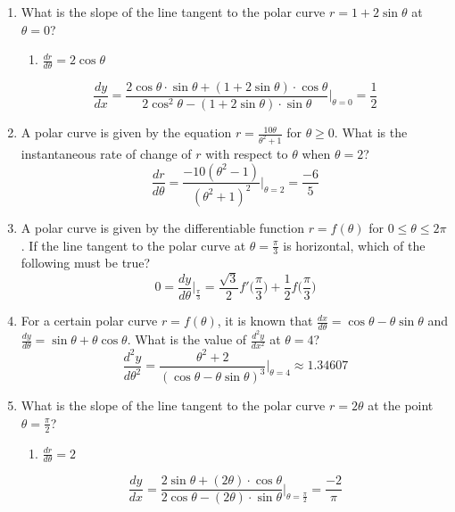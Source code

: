 \documentclass[12pt]{article}
\begin{document}
\begin{enumerate}
	\item What is the slope of the line tangent to the polar curve $r=1+2\sin \theta$ at $\theta=0$?
	      \begin{enumerate}
	      	\item $\frac{dr}{d\theta} = 2\cos \theta$
	      \end{enumerate}
	      $$\frac{dy}{dx} = \frac{2\cos\theta \cdot \sin \theta + (1+2\sin \theta) \cdot \cos\theta}{2\cos^2\theta -(1+2\sin \theta)\cdot \sin\theta}\biggr\rvert_{\theta=0} = \boxed{\frac{1}{2}}$$
	\item A polar curve is given by the equation $r=\frac{10\theta}{\theta^2+1}$ for $\theta \geq 0$. What is the instantaneous rate of change of $r$ with respect to $\theta$ when $\theta=2$?
	      $$\frac{dr}{d\theta} = \frac{-10(\theta^2-1)}{(\theta^2+1)^2}\biggr\rvert_{\theta = 2} = \boxed{\frac{-6}{5}}$$
	\item A polar curve is given by the differentiable function $r=f(\theta)$ for $0\leq \theta \leq 2\pi$. If the line tangent to the polar curve at $\theta=\frac{\pi}{3}$ is horizontal, which of the following must be true?
	      $$0=\frac{dy}{d\theta}\biggr\rvert_{\frac{\pi}{3}} = \boxed{\frac{\sqrt{3}}{2}f'\bigg(\frac{\pi}{3}\bigg)+\frac{1}{2}f\bigg(\frac{\pi}{3}\bigg)} $$
	\item For a certain polar curve $r=f(\theta)$, it is known that $\frac{dx}{d\theta} = \cos \theta - \theta\sin\theta$ and $\frac{dy}{d\theta} = \sin \theta + \theta\cos \theta$. What is the value of $\frac{d^2y}{dx^2}$ at $\theta=4$?
	      $$\frac{d^2y}{d\theta^2} = \frac{\theta^2+2}{(\cos\theta - \theta\sin\theta)^3}\biggr\rvert_{\theta = 4} \approx \boxed{1.34607}$$
	\item What is the slope of the line tangent to the polar curve $r=2\theta$ at the point $\theta=\frac{\pi}{2}$?
	      \begin{enumerate}
	      	\item $\frac{dr}{d\theta} = 2$
	      \end{enumerate}
	      $$\frac{dy}{dx} = \frac{2 \sin \theta + (2\theta) \cdot \cos\theta}{2\cos\theta -(2\theta)\cdot \sin\theta}\biggr\rvert_{\theta=\frac{\pi}{2}} = \boxed{\frac{-2}{\pi}}$$
	      	

\end{enumerate}
\end{document}
